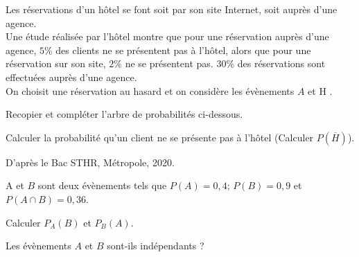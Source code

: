 \documentclass[11pt,a4paper]{article}  %
\begin{document}
Les réservations d'un hôtel se font soit par son site Internet, soit auprès d'une agence.\\
Une étude réalisée par l'hôtel montre que pour une réservation auprès d'une agence, $5 \%$ des clients ne se présentent pas à l'hôtel, alors que pour une réservation sur son site, $2 \%$ ne se présentent pas. $30 \%$ des réservations sont effectuées auprès d'une agence.\\
On choisit une réservation au hasard et on considère les évènements $A$  et $\mathrm{H}$ .\\
\begin{enumMet}
	\item Recopier et compléter l'arbre de probabilités ci-dessous.\\
	\item Calculer la probabilité qu'un client ne se présente pas à l'hôtel (Calculer $P(\overline{H})$).
\end{enumMet}
D'après le Bac STHR, Métropole, 2020.


A et $B$ sont deux évènements tels que $P(A)=0,4$; $P(B)=0,9$ et $P(A \cap B)=0,36$.
\begin{enumMet}
	\item Calculer $P_A(B)$ et $P_B(A)$.
	\item Les évènements $A$ et $B$ sont-ils indépendants ?
\end{enumMet}
\end{document}
